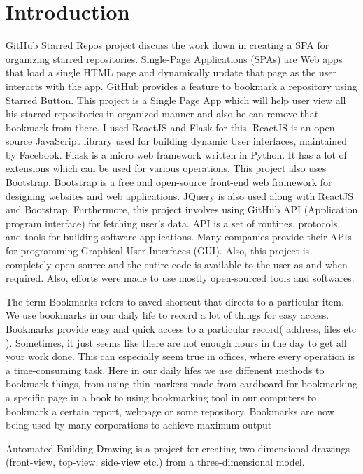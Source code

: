 \section{Introduction}

GitHub Starred Repos project discuss the work down in creating a SPA for organizing starred repositories. Single-Page Applications (SPAs) are Web apps that load a single HTML page and dynamically update that page as the user interacts with the app. GitHub provides a feature to bookmark a repository using Starred Button. This project is a Single Page App which will help user view all his starred repositories in organized manner and also he can remove that bookmark from there. I used ReactJS and Flask for this. ReactJS is an open-source JavaScript library used for building dynamic User interfaces, maintained by Facebook. Flask is a micro web framework written in Python. It has a lot of extensions which can be used for various operations.
This project also uses Bootstrap. Bootstrap is a free and open-source front-end web framework for designing websites and web applications. JQuery is also used along with ReactJS and Bootstrap.
Furthermore, this project involves using GitHub API (Application program interface) for fetching user’s data. API is a set of routines, protocols, and tools for building software applications. Many companies provide their APIs for programming Graphical User Interfaces (GUI).
Also, this project is completely open source and the entire code is available to the user as and when required. Also, eﬀorts were made to use mostly open-sourced tools and softwares.


The term Bookmarks refers to saved shortcut that directs to a particular item. We use bookmarks in our daily life to record a lot of things for easy access. Bookmarks provide easy and quick access to a particular record( address, ﬁles etc ). Sometimes, it just seems like there are not enough hours in the day to get all your work done. This can especially seem true in oﬃces, where every operation is a time-consuming task. Here in our daily lifes we use diﬀenent methods to bookmark things, from using thin markers made from cardboard for bookmarking a speciﬁc page in a book to using bookmarking tool in our computers to bookmark a certain report, webpage or some repository. Bookmarks are now being used by many corporations to achieve maximum output

Automated Building Drawing is a project for creating two-dimensional drawings (front-view, top-view, side-view etc.) from a three-dimensional model.

